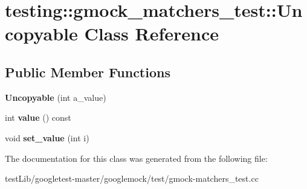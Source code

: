 \hypertarget{classtesting_1_1gmock__matchers__test_1_1Uncopyable}{}\section{testing\+:\+:gmock\+\_\+matchers\+\_\+test\+:\+:Uncopyable Class Reference}
\label{classtesting_1_1gmock__matchers__test_1_1Uncopyable}
\subsection*{Public Member Functions}
\begin{DoxyCompactItemize}
\item 
\mbox{\label{classtesting_1_1gmock__matchers__test_1_1Uncopyable_a827c1de4fe4c2e40791dd87a13972bc7}} 
{\bfseries Uncopyable} (int a\+\_\+value)
\item 
\mbox{\label{classtesting_1_1gmock__matchers__test_1_1Uncopyable_a23512131b948e40ded06555848829866}} 
int {\bfseries value} () const
\item 
\mbox{\label{classtesting_1_1gmock__matchers__test_1_1Uncopyable_a3f30b54f22caac3aa7e6fb79012dc52f}} 
void {\bfseries set\+\_\+value} (int i)
\end{DoxyCompactItemize}


The documentation for this class was generated from the following file\+:\begin{DoxyCompactItemize}
\item 
test\+Lib/googletest-\/master/googlemock/test/gmock-\/matchers\+\_\+test.\+cc\end{DoxyCompactItemize}
